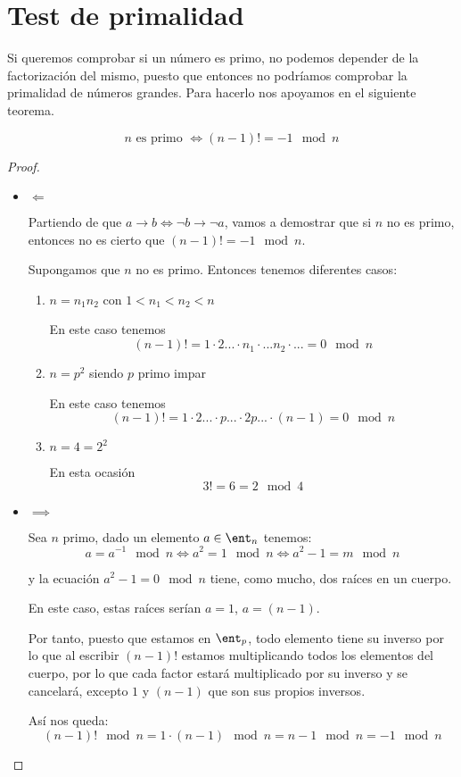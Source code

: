 \section{Test de primalidad}

Si queremos comprobar si un número es primo, no podemos depender de la factorización del mismo, puesto que entonces no podríamos comprobar la primalidad de números grandes. Para hacerlo nos apoyamos en el siguiente teorema.

\begin{theorem}
\[n \text{ es primo } \iff (n-1)! = -1 \mod n\]
\end{theorem}
\begin{proof}
\begin{itemize}
\item $\Longleftarrow$

Partiendo de que $a \to b \iff \neg b \to \neg a$, vamos a demostrar que si $n$ no es primo, entonces no es cierto que $(n-1)!=-1 \mod n$.

Supongamos que $n$ no es primo. Entonces tenemos diferentes casos:
\begin{enumerate}
\item $n=n_1n_2$ con $1<n_1<n_2<n$

En este caso tenemos
\[(n-1)!=1\cdot 2 ... \cdot n_1 \cdot ... n_2 \cdot ... = 0 \mod n\]

\item $n=p^2$ siendo $p$ primo impar

En este caso tenemos
\[(n-1)! = 1 \cdot 2 ... \cdot p ... \cdot 2p ... \cdot (n-1) = 0 \mod n\]

\item $n=4=2^2$

En esta ocasión
\[3! = 6 = 2 \mod 4\]
\end{enumerate}

\item $\implies$

Sea $n$ primo, dado un elemento $a\in \ent_n$ tenemos:
\[a=a^{-1} \mod n \iff a^2 = 1 \mod n \iff a^2-1 = m \mod n\]

y la ecuación $a^2-1=0\mod n$ tiene, como mucho, dos raíces en un cuerpo.

En este caso, estas raíces serían $a=1$, $a=(n-1)$.

Por tanto, puesto que estamos en $\ent_p$, todo elemento tiene su inverso por lo que al escribir $(n-1)!$ estamos multiplicando todos los elementos del cuerpo, por lo que cada factor estará multiplicado por su inverso y se cancelará, excepto $1$ y $(n-1)$ que son sus propios inversos.

Así nos queda:
\[(n-1)! \mod n = 1 \cdot (n-1) \mod n = n-1 \mod n = -1 \mod n\]
\end{itemize}
\end{proof}

